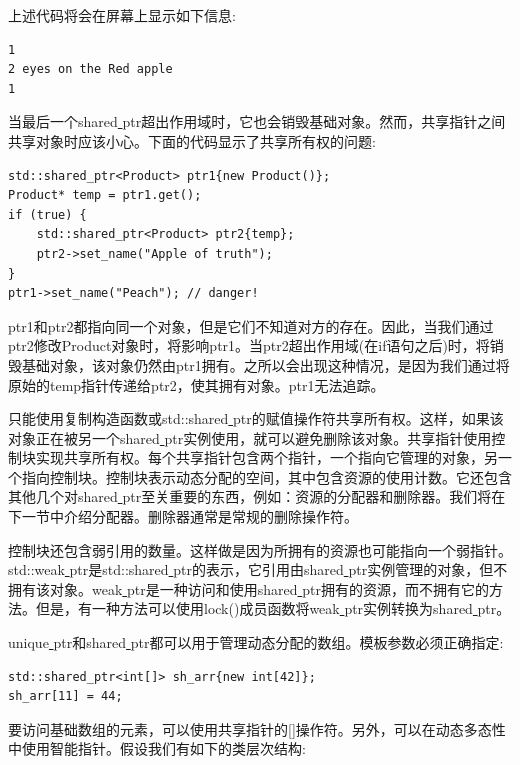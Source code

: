 上述代码将会在屏幕上显示如下信息: \par

\begin{lstlisting}[caption={}]
1
2 eyes on the Red apple
1
\end{lstlisting}

当最后一个shared\underline{ }ptr超出作用域时，它也会销毁基础对象。然而，共享指针之间共享对象时应该小心。下面的代码显示了共享所有权的问题: \par

\begin{lstlisting}[caption={}]
std::shared_ptr<Product> ptr1{new Product()};
Product* temp = ptr1.get();
if (true) {
	std::shared_ptr<Product> ptr2{temp};
	ptr2->set_name("Apple of truth");
}
ptr1->set_name("Peach"); // danger!
\end{lstlisting}

ptr1和ptr2都指向同一个对象，但是它们不知道对方的存在。因此，当我们通过ptr2修改Product对象时，将影响ptr1。当ptr2超出作用域(在if语句之后)时，将销毁基础对象，该对象仍然由ptr1拥有。之所以会出现这种情况，是因为我们通过将原始的temp指针传递给ptr2，使其拥有对象。ptr1无法追踪。 \par
只能使用复制构造函数或std::shared\underline{ }ptr的赋值操作符共享所有权。这样，如果该对象正在被另一个shared\underline{ }ptr实例使用，就可以避免删除该对象。共享指针使用控制块实现共享所有权。每个共享指针包含两个指针，一个指向它管理的对象，另一个指向控制块。控制块表示动态分配的空间，其中包含资源的使用计数。它还包含其他几个对shared\underline{ }ptr至关重要的东西，例如：资源的分配器和删除器。我们将在下一节中介绍分配器。删除器通常是常规的删除操作符。 \par
控制块还包含弱引用的数量。这样做是因为所拥有的资源也可能指向一个弱指针。std::weak\underline{ }ptr是std::shared\underline{ }ptr的表示，它引用由shared\underline{ }ptr实例管理的对象，但不拥有该对象。weak\underline{ }ptr是一种访问和使用shared\underline{ }ptr拥有的资源，而不拥有它的方法。但是，有一种方法可以使用lock()成员函数将weak\underline{ }ptr实例转换为shared\underline{ }ptr。\par
unique\underline{ }ptr和shared\underline{ }ptr都可以用于管理动态分配的数组。模板参数必须正确指定: \par

\begin{lstlisting}[caption={}]
std::shared_ptr<int[]> sh_arr{new int[42]};
sh_arr[11] = 44;
\end{lstlisting}

要访问基础数组的元素，可以使用共享指针的[]操作符。另外，可以在动态多态性中使用智能指针。假设我们有如下的类层次结构: \par

